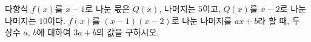 다항식 $f(x)$를 $x-1$로 나눈 몫은 $Q(x)$, 나머지는 $5$이고, $Q(x)$를 $x-2$로 나눈 나머지는 $10$이다. $f(x)$를 $(x-1)(x-2)$로 나눈 나머지를 $ax+b$라 할 때, 두 상수 $a$, $b$에 대하여 $3a+b$의 값을 구하시오.
